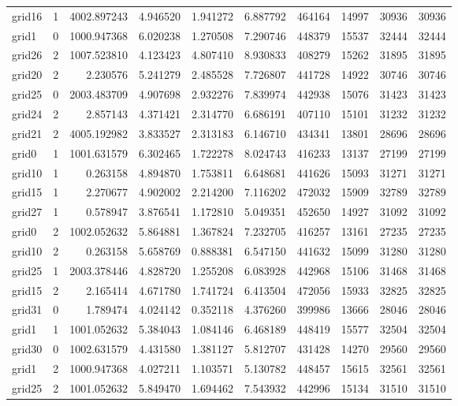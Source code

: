 \begin{longtable}{|l|r|r|r|r|r|r|r|r|r|}
grid16 & 1 & 4002.897243 & 4.946520 & 1.941272 & 6.887792 & 464164 & 14997 & 30936 & 30936 \\
grid1 & 0 & 1000.947368 & 6.020238 & 1.270508 & 7.290746 & 448379 & 15537 & 32444 & 32444 \\
grid26 & 2 & 1007.523810 & 4.123423 & 4.807410 & 8.930833 & 408279 & 15262 & 31895 & 31895 \\
grid20 & 2 & 2.230576 & 5.241279 & 2.485528 & 7.726807 & 441728 & 14922 & 30746 & 30746 \\
grid25 & 0 & 2003.483709 & 4.907698 & 2.932276 & 7.839974 & 442938 & 15076 & 31423 & 31423 \\
grid24 & 2 & 2.857143 & 4.371421 & 2.314770 & 6.686191 & 407110 & 15101 & 31232 & 31232 \\
grid21 & 2 & 4005.192982 & 3.833527 & 2.313183 & 6.146710 & 434341 & 13801 & 28696 & 28696 \\
grid0 & 1 & 1001.631579 & 6.302465 & 1.722278 & 8.024743 & 416233 & 13137 & 27199 & 27199 \\
grid10 & 1 & 0.263158 & 4.894870 & 1.753811 & 6.648681 & 441626 & 15093 & 31271 & 31271 \\
grid15 & 1 & 2.270677 & 4.902002 & 2.214200 & 7.116202 & 472032 & 15909 & 32789 & 32789 \\
grid27 & 1 & 0.578947 & 3.876541 & 1.172810 & 5.049351 & 452650 & 14927 & 31092 & 31092 \\
grid0 & 2 & 1002.052632 & 5.864881 & 1.367824 & 7.232705 & 416257 & 13161 & 27235 & 27235 \\
grid10 & 2 & 0.263158 & 5.658769 & 0.888381 & 6.547150 & 441632 & 15099 & 31280 & 31280 \\
grid25 & 1 & 2003.378446 & 4.828720 & 1.255208 & 6.083928 & 442968 & 15106 & 31468 & 31468 \\
grid15 & 2 & 2.165414 & 4.671780 & 1.741724 & 6.413504 & 472056 & 15933 & 32825 & 32825 \\
grid31 & 0 & 1.789474 & 4.024142 & 0.352118 & 4.376260 & 399986 & 13666 & 28046 & 28046 \\
grid1 & 1 & 1001.052632 & 5.384043 & 1.084146 & 6.468189 & 448419 & 15577 & 32504 & 32504 \\
grid30 & 0 & 1002.631579 & 4.431580 & 1.381127 & 5.812707 & 431428 & 14270 & 29560 & 29560 \\
grid1 & 2 & 1000.947368 & 4.027211 & 1.103571 & 5.130782 & 448457 & 15615 & 32561 & 32561 \\
grid25 & 2 & 1001.052632 & 5.849470 & 1.694462 & 7.543932 & 442996 & 15134 & 31510 & 31510 \\

\end{longtable}
